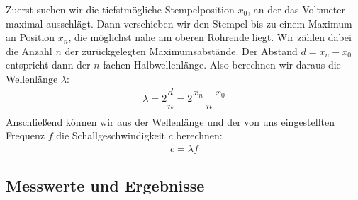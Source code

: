 \documentclass{scrartcl}
\begin{document}
Zuerst suchen wir die tiefstmögliche Stempelposition $x_{0}$, an der das Voltmeter maximal ausschlägt. Dann verschieben wir den Stempel bis zu einem Maximum an Position $x_{n}$, die möglichst nahe am oberen Rohrende liegt. Wir zählen dabei die Anzahl $n$ der zurückgelegten Maximumsabstände. Der Abstand $d = x_{n} - x_{0}$ entspricht dann der $n$-fachen Halbwellenlänge. Also berechnen wir daraus die Wellenlänge $\lambda$:
\begin{align*}
\lambda = 2 \dfrac{d}{n} =  2 \dfrac{x_{n}-x_{0}}{n}\\
\end{align*}
Anschließend können wir aus der Wellenlänge und der von uns eingestellten Frequenz $f$ die Schallgeschwindigkeit $c$ berechnen:
\begin{align*}
c = \lambda f
\end{align*}
\subsection{Messwerte und Ergebnisse}
\end{document}
